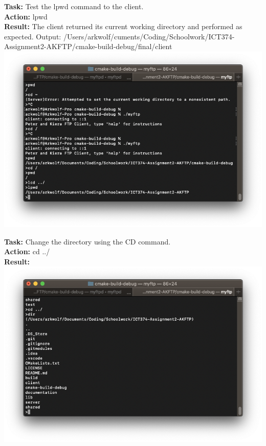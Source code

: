 \documentclass{article}
\begin{document}
\textbf{Task:} Test the lpwd command to the client.\\
\textbf{Action:} lpwd\\
\textbf{Result:} The client returned its current working directory and performed as expected. Output: /Users/arkwolf/cuments/Coding/Schoolwork/ICT374-Assignment2-AKFTP/cmake-build-debug/final/client\\
\includegraphics[width=\textwidth]{testpictures/lpwd}

\textbf{Task:} Change the directory using the CD command.\\
\textbf{Action:} cd ../\\
\textbf{Result:} \\
\includegraphics[width=\textwidth]{testpictures/cdserver}
\end{document}
